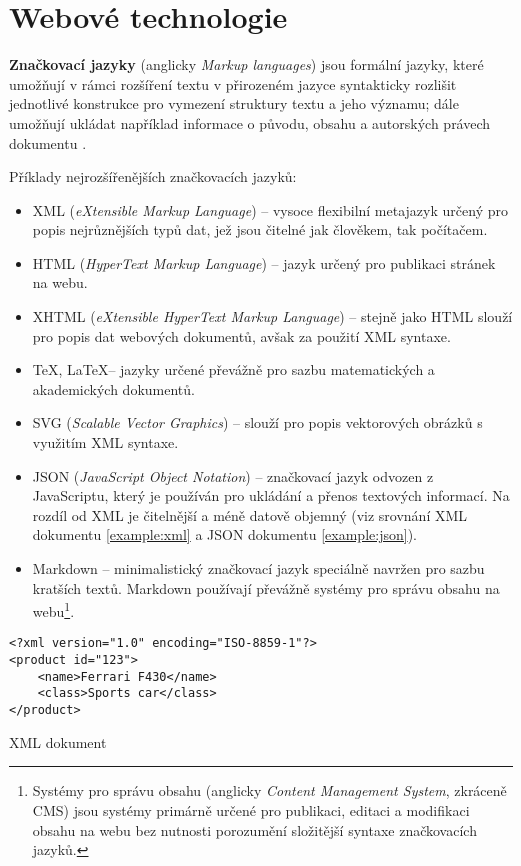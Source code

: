 \chapter{Webové technologie}
\label{chap:languages}

\textbf{Značkovací jazyky} (anglicky \textit{Markup languages}) jsou formální jazyky, které umožňují v rámci rozšíření textu v přirozeném jazyce syntakticky rozlišit jednotlivé konstrukce pro vymezení struktury textu a jeho významu; dále umožňují ukládat například informace o původu, obsahu a autorských právech dokumentu \cite{14} \cite{16}.

Příklady nejrozšířenějších značkovacích jazyků:

\begin{itemize}
    \item XML (\textit{eXtensible Markup Language}) -- vysoce flexibilní metajazyk určený pro popis nejrůznějších typů dat, jež jsou čitelné jak člověkem, tak počítačem.
    \item HTML (\textit{HyperText Markup Language}) -- jazyk určený pro publikaci stránek na webu.
    \item XHTML (\textit{eXtensible HyperText Markup Language}) -- stejně jako HTML slouží pro popis dat webových dokumentů, avšak za použití XML syntaxe.
    \item \TeX, \LaTeX -- jazyky určené převážně pro sazbu matematických a akademických dokumentů.
    \item SVG (\textit{Scalable Vector Graphics}) -- slouží pro popis vektorových obrázků s využitím XML syntaxe.
    \item JSON (\textit{JavaScript Object Notation}) -- značkovací jazyk odvozen z JavaScriptu, který je používán pro ukládání a přenos textových informací. Na rozdíl od XML je čitelnější a méně datově objemný (viz srovnání XML dokumentu \ref{example:xml} a JSON dokumentu \ref{example:json}).
    \item Markdown -- minimalistický značkovací jazyk speciálně navržen pro sazbu kratších textů. Markdown používají převážně systémy pro správu obsahu na webu\footnote{Systémy pro správu obsahu (anglicky \textit{Content Management System}, zkráceně CMS) jsou systémy primárně určené pro publikaci, editaci a modifikaci obsahu na webu bez nutnosti porozumění složitější syntaxe značkovacích jazyků.}.
\end{itemize}

\begin{example}
    \centering
    \begin{lstlisting}
<?xml version="1.0" encoding="ISO-8859-1"?>
<product id="123">
    <name>Ferrari F430</name>
    <class>Sports car</class>
</product>
    \end{lstlisting}
    \caption{XML dokument}
    \label{example:xml}
\end{example}

